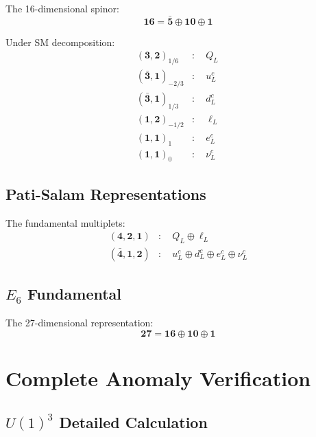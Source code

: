 \documentclass[11pt,a4paper]{article}
\begin{document}
The 16-dimensional spinor:
\begin{equation}
\label{eq:so10-16}
\mathbf{16} = \mathbf{\bar{5}} \oplus \mathbf{10} \oplus \mathbf{1}
\end{equation}

Under SM decomposition:
\begin{align}
\label{eq:so10-decomp-q}
(\mathbf{3}, \mathbf{2})_{1/6} &: \quad Q_L \\
\label{eq:so10-decomp-uc}
(\bar{\mathbf{3}}, \mathbf{1})_{-2/3} &: \quad u^c_L \\
\label{eq:so10-decomp-dc}
(\bar{\mathbf{3}}, \mathbf{1})_{1/3} &: \quad d^c_L \\
\label{eq:so10-decomp-l}
(\mathbf{1}, \mathbf{2})_{-1/2} &: \quad \ell_L \\
\label{eq:so10-decomp-ec}
(\mathbf{1}, \mathbf{1})_1 &: \quad e^c_L \\
\label{eq:so10-decomp-nuc}
(\mathbf{1}, \mathbf{1})_0 &: \quad \nu^c_L
\end{align}

\subsection{Pati-Salam Representations}
\label{app:ps-reps}

The fundamental multiplets:
\begin{align}
\label{eq:ps-421}
(\mathbf{4}, \mathbf{2}, \mathbf{1}) &: \quad Q_L \oplus \ell_L \\
\label{eq:ps-412}
(\bar{\mathbf{4}}, \mathbf{1}, \mathbf{2}) &: \quad u^c_L \oplus d^c_L \oplus e^c_L \oplus \nu^c_L
\end{align}

\subsection{$E_6$ Fundamental}
\label{app:e6-reps}

The 27-dimensional representation:
\begin{equation}
\label{eq:e6-27}
\mathbf{27} = \mathbf{16} \oplus \mathbf{10} \oplus \mathbf{1}
\end{equation}

\section{Complete Anomaly Verification}
\label{app:complete-anomaly}

\subsection{$U(1)^3$ Detailed Calculation}
\label{app:u1-cubed-detail}
\end{document}
